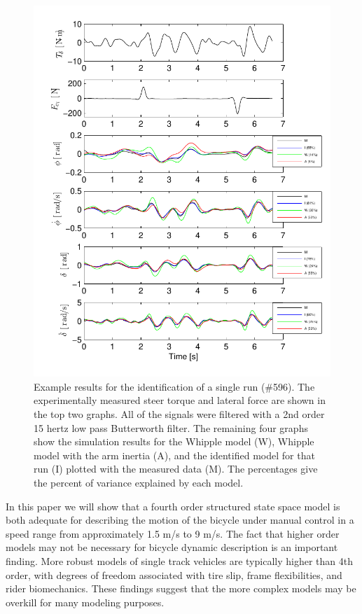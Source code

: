 \documentclass{article}
\begin{document}
\begin{figure}
  \centering
  \includegraphics[width=5.0in]{example-fit.pdf}
  \caption{Example results for the identification of a single run (\#596). The
  experimentally measured steer torque and lateral force are shown in the top
  two graphs. All of the signals were filtered with a 2nd order 15 hertz low
  pass Butterworth filter. The remaining four graphs show the simulation
  results for the Whipple model (W), Whipple model with the arm inertia (A),
  and the identified model for that run (I) plotted with the measured data (M).
  The percentages give the percent of variance explained by each model.}
\end{figure}

In this paper we will show that a fourth order structured state space model is
both adequate for describing the motion of the bicycle under manual control in
a speed range from approximately 1.5 m/s to 9 m/s. The fact that higher order
models may not be necessary for bicycle dynamic description is an important
finding. More robust models of single track vehicles are typically higher than
4th order, with degrees of freedom associated with tire slip, frame
flexibilities, and rider biomechanics. These findings suggest that the more
complex models may be overkill for many modeling purposes.
\end{document}
